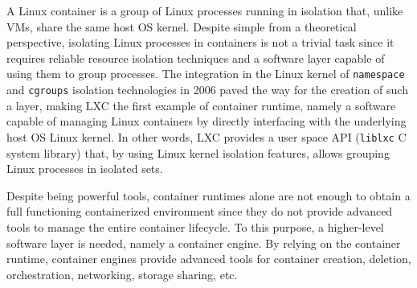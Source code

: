 A Linux container is a group of Linux processes running in isolation that, unlike VMs, share the same host OS kernel. 
Despite simple from a theoretical perspective, isolating Linux processes in containers is not a trivial task since it requires reliable resource isolation techniques and a software layer capable of using them to group processes. 
The integration in the Linux kernel of \texttt{namespace} and \texttt{cgroups} isolation technologies in 2006 paved the way for the creation of such a layer, making LXC the first example of container runtime, namely a software capable of managing Linux containers by directly interfacing with the underlying host OS Linux kernel.
In other words, LXC provides a user space API (\texttt{liblxc} C system library) that, by using Linux kernel isolation features, allows grouping Linux processes in isolated sets.

Despite being powerful tools, container runtimes alone are not enough to obtain a full functioning containerized environment since they do not provide advanced tools to manage the entire container lifecycle.  
To this purpose, a higher-level software layer is needed, namely a container engine. 
By relying on the container runtime, container engines provide advanced tools for container creation, deletion, orchestration, networking, storage sharing, etc. 


